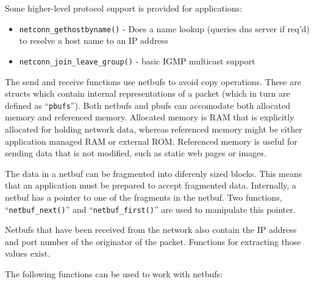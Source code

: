 Some higher-level protocol support is provided for applications:

\begin{itemize}
  \item \verb/netconn_gethostbyname()/ - Does a name lookup (queries dns server if req'd) to resolve a host name to an IP address
  \item \verb/netconn_join_leave_group()/ - basic IGMP multicast support
\end{itemize}

The send and receive functions use netbufs to avoid copy operations. These are structs which contain internal representations of a packet (which in turn are defined as ``\verb/pbufs/''). Both netbufs and pbufs can accomodate both allocated memory and referenced memory. Allocated memory is RAM that is explicitly allocated for holding network data, whereas referenced memory might be either application managed RAM or external ROM. Referenced memory is useful for sending data that is not modified, such as static web pages or images.

The data in a netbuf can be fragmented into diferenly sized blocks. This means that an application must be prepared to accept fragmented data. Internally, a netbuf has a pointer to one of the fragments in the netbuf. Two functions, ``\verb/netbuf_next()/'' and ``\verb/netbuf_first()/'' are used to manipulate this pointer.

Netbufs that have been received from the network also contain the IP address and port number of the originator of the packet. Functions for extracting those values exist.

The following functions can be used to work with netbufs:

